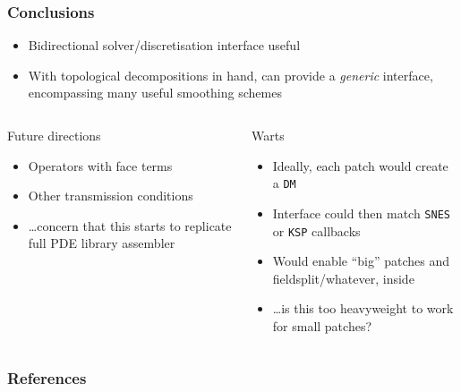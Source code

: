 \documentclass[presentation,aspectratio=43,10pt]{beamer}
\begin{document}
\begin{frame}
  \frametitle{Conclusions}
  \begin{itemize}
  \item Bidirectional solver/discretisation interface useful
  \item With topological decompositions in hand, can provide a
    \emph{generic} interface, encompassing many useful smoothing schemes
  \end{itemize}

  \begin{columns}[T]
    \begin{column}{0.48\textwidth}
      \begin{block}{Future directions}
        \begin{itemize}
        \item Operators with face terms
        \item Other transmission conditions
        \item \dots concern that this starts to replicate full PDE
          library assembler
        \end{itemize}
      \end{block}
    \end{column}
    \begin{column}{0.52\textwidth}
      \begin{block}{Warts}
        \begin{itemize}
        \item Ideally, each patch would create a \texttt{DM}
        \item Interface could then match \texttt{SNES} or
          \texttt{KSP} callbacks
        \item Would enable ``big'' patches and fieldsplit/whatever,
          inside
        \item \dots is this too heavyweight to work for small patches?
        \end{itemize}
      \end{block}
    \end{column}
  \end{columns}
\end{frame}

\appendix
\begin{frame}
  \frametitle{References}
  \printbibliography[heading=none]
\end{frame}
\end{document}
